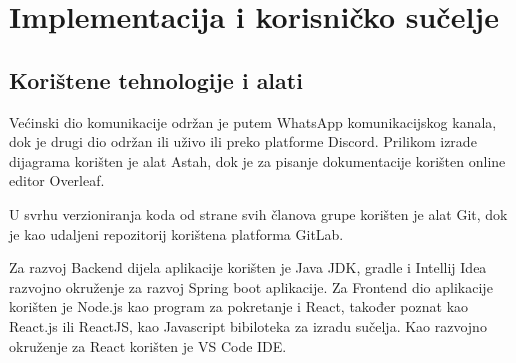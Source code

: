 \chapter{Implementacija i korisničko sučelje}
		
		\section{Korištene tehnologije i alati}
		
			

            {Većinski dio komunikacije održan je putem WhatsApp\footnotemark{} komunikacijskog kanala, dok je drugi dio održan ili uživo ili preko platforme Discord\footnotemark{}. Prilikom izrade dijagrama korišten je alat Astah\footnotemark{}, dok je za pisanje dokumentacije korišten online editor Overleaf\footnotemark{}.}\vspace{0.3cm}

            {U svrhu verzioniranja koda od strane svih članova grupe korišten je alat Git\footnotemark{}, dok je kao udaljeni repozitorij korištena platforma GitLab\footnotemark{}.}\vspace{0.2cm}
            
            {Za razvoj Backend dijela aplikacije korišten je Java JDK\footnotemark{}, gradle\footnotemark{} i Intellij Idea\footnotemark{} razvojno okruženje za razvoj Spring boot\footnotemark{} aplikacije. Za Frontend dio aplikacije korišten je Node.js\footnotemark{} kao program za pokretanje i React\footnotemark{}, također poznat kao React.js ili ReactJS, kao Javascript\footnotemark{} bibiloteka za izradu sučelja. Kao razvojno okruženje za React korišten je VS Code\footnotemark{} IDE.}\vspace{0.3cm}
            
